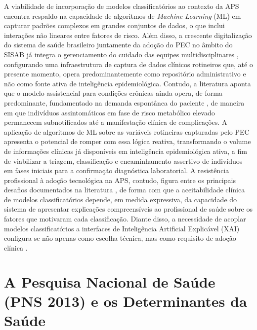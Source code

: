 A viabilidade de incorporação de modelos classificatórios ao contexto da APS encontra respaldo na capacidade de algoritmos de \textit{Machine Learning} (ML) em capturar padrões complexos em grandes conjuntos de dados, o que inclui interações não lineares entre fatores de risco. Além disso, a crescente digitalização do sistema de saúde brasileiro juntamente da adoção do PEC no âmbito do SISAB já integra o gerenciamento do cuidado das equipes multidisciplinares \cite{brasil_esus_aps}, configurando uma infraestrutura de captura de dados clínicos rotineiros que, até o presente momento, opera predominantemente como repositório administrativo e não como fonte ativa de inteligência epidemiológica. Contudo, a literatura aponta que o modelo assistencial para condições crônicas ainda opera, de forma predominante, fundamentado na demanda espontânea do paciente \cite{geremia2020atenccao}, de maneira em que indivíduos assintomáticos em fase de risco metabólico elevado permanecem subnotificados até a manifestação clínica de complicações. A aplicação de algoritmos de ML sobre as variáveis rotineiras capturadas pelo PEC apresenta o potencial de romper com essa lógica reativa, transformando o volume de informações clínicas já disponíveis em inteligência epidemiológica ativa, a fim de viabilizar a triagem, classificação e encaminhamento assertivo de indivíduos em fases iniciais para a confirmação diagnóstica laboratorial. A resistência profissional à adoção tecnológica na APS, contudo, figura entre os principais desafios documentados na literatura \cite{geremia2020atenccao}, de forma com que a aceitabilidade clínica de modelos classificatórios depende, em medida expressiva, da capacidade do sistema de apresentar explicações compreensíveis ao profissional de saúde sobre os fatores que motivaram cada classificação. Diante disso, a necessidade de acoplar modelos classificatórios a interfaces de Inteligência Artificial Explicável (XAI) configura-se não apenas como escolha técnica, mas como requisito de adoção clínica \cite{salih2025perspective}.


\section{A Pesquisa Nacional de Saúde (PNS 2013) e os Determinantes da Saúde} \label{sec:pns}

